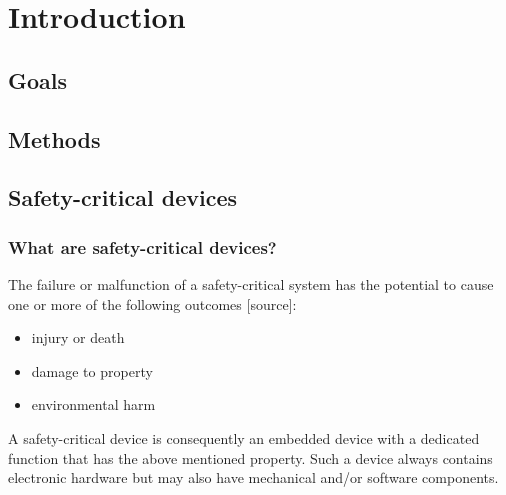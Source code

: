 
\chapter{Introduction} %

\label{Chapter1} %


\newcommand{\keyword}[1]{\textbf{#1}}
\newcommand{\tabhead}[1]{\textbf{#1}}
\newcommand{\code}[1]{\texttt{#1}}
\newcommand{\file}[1]{\texttt{\bfseries#1}}
\newcommand{\option}[1]{\texttt{\itshape#1}}

\newcommand{\mfg}{manufacturer}

\section{Goals}


\section{Methods}


\section{Safety-critical devices}
\subsection{What are safety-critical devices?}
The failure or malfunction of a safety-critical system has the potential to cause one or more of the following outcomes [source]:
\begin{itemize}
\item injury or death
\item damage to property
\item environmental harm
\end{itemize}
A safety-critical device is consequently an embedded device with a dedicated function that has the above mentioned property. Such a device always contains electronic hardware but may also have mechanical and/or software components.

